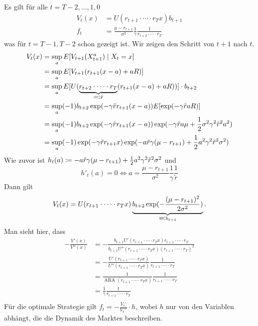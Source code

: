 \documentclass[a4paper,twoside,DIV15,BCOR12mm]{scrbook}
\DeclareMathOperator{\ARA}{ARA}
\begin{document}
\begin{beispiel}
Es gilt für alle $t=T-2,\ldots,1, 0$
\begin{align*}
V_t(x) &= U(r_{t+1}\cdot \cdots\cdot r_T x) b_{t+1} \\
f_t &= \frac{\mu-r_{t+1}}{\sigma^2} \frac1\gamma \frac1{r_{t+2}\cdot \cdots \cdot r_T}
\end{align*}
was für $t=T-1,T-2$ schon gezeigt ist. Wir zeigen den Schritt von $t+1$ nach $t$.
\begin{align*}
V_t(x) &= \sup_a E[V_{t+1} (X_{t+1}^a) \mid X_t = x] \\
&= \sup_a E[V_{t+1} (r_{t+1} (x-a) + aR)] \\
&= \sup_a E[U(\underbrace{r_{t+2}\cdot \cdots\cdot r_T}_{\ad \tilde r} (r_{t+1} (x-a) + aR))]\cdot b_{t+2} \\
&= \sup_a (-1) b_{t+2} \exp(-\gamma \tilde r r_{t+1} (x-a)) E[\exp(-\gamma \tilde r a R)]\\
&= \sup_a (-1) b_{t+2} \exp(-\gamma \tilde r r_{t+1} (x-a)) \exp(-\gamma \tilde r a \mu + \frac12 \sigma^2 \gamma ^2 \tilde r^2 a^2) \\
&= \sup_a (-1) \exp(-\gamma\tilde r r_{t+1} x) \exp(-a\tilde{r} \gamma(\mu-r_{t+1}) + \frac12 a^2 \gamma ^2 \tilde r^2 \sigma^2)
\end{align*}
Wie zuvor ist $h_t(a) \da -a\tilde r \gamma(\mu- r_{t+1}) + \frac12 a^2 \gamma^2 \tilde r^2 \sigma^2$ und
\[
h'_t(a) = 0 \iff
a= \frac{\mu-r_{t+1}}{\sigma^2} \frac1\gamma \frac1{\tilde r}
\]
Dann gilt
\begin{align*}
V_t(x) = U(r_{t+1} \cdot \cdots \cdot r_T x) \underbrace{b_{t+2} \exp(-\frac{(\mu-r_{t+1})^2}{2\sigma^2})}_{\ad b_{t+1}}.
\end{align*}
Man sieht hier, dass 
\begin{align*}
-\frac{V'(x)}{V''(x)} &= - \frac{ b_{t+1} U'(r_{r+1}\cdot\cdots\cdot r_T x) r_{t+1}\cdot\cdots\cdot r_T}{b_{t+1} U''(r_{r+1}\cdot\cdots\cdot r_T x) (r_{t+1}\cdot\cdots\cdot r_T)^2} \\
&= - \frac{U'(r_{t+1}\cdot\cdots\cdot r_T x)}{U''(r_{t+1}\cdot\cdots\cdot r_Tx)} \frac1{r_{t+1}\cdot\cdots\cdot r_T} \\
&= \frac1{\ARA(r_{t+1}\cdot\cdots\cdot r_Tx)} \frac1{r_{t+1}\cdot\cdots\cdot r_T} \\
&= \frac1{\gamma} \frac1{r_{t+1}\cdot\cdots\cdot r_T} \\ 
\end{align*}
Für die optimale Strategie gilt $f_t = -\frac{V_t'}{V_t''} \cdot h$, wobei $h$ nur von den Variablen abhängt, die die Dynamik des Marktes beschreiben.
\end{beispiel}
\end{document}
